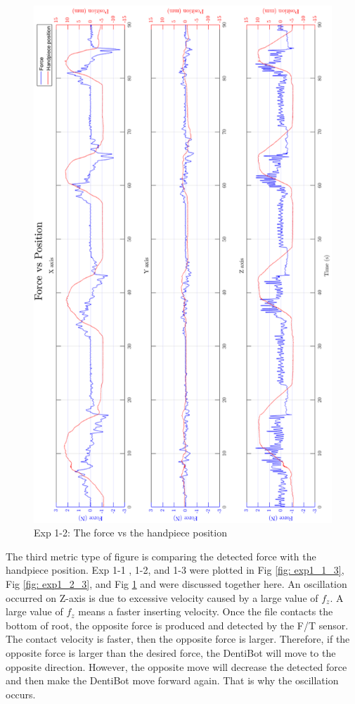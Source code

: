 \begin{figure}[htbp]
\begin{center}
\includegraphics[width=0.9\linewidth]{Images/exp/exp1_3_3.png}
\caption{Exp 1-2: The force vs the handpiece position}
\label{fig: exp1_3_3}
\end{center}
\end{figure}

\par
The third metric type of figure is comparing the detected force with the handpiece position. Exp 1-1 , 1-2, and 1-3 were plotted in Fig \ref{fig: exp1_1_3}, Fig \ref{fig: exp1_2_3}, and Fig \ref{fig: exp1_3_3} and were discussed together here. An oscillation occurred on Z-axis is due to excessive velocity caused by a large value of $f_z$. A large value of $f_z$ means a faster inserting velocity. Once  the file contacts the bottom of root, the opposite force is produced and detected by the F/T sensor. The contact velocity is faster, then the opposite force is larger. Therefore, if the opposite force is larger than the desired force, the DentiBot will move to the opposite direction. However, the opposite move will decrease the detected force and then make the DentiBot move forward again. That is why the oscillation occurs.
